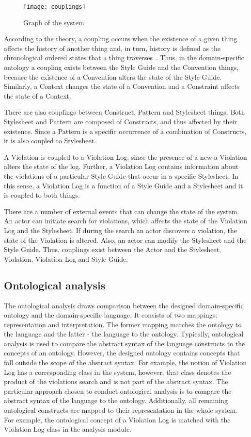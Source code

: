 \begin{figure}[h!]
  \centering
  \caption{Graph of the system}
  \label{fig:couplings}
  \texttt{[image: couplings]}
\end{figure}

According to the theory, a coupling occurs when the existence of a given thing affects the history
of another thing and, in turn, history is defined as the chronological ordered states that a thing
traverses~\cite{wand1990ontological}. Thus, in the domain-specific ontology a coupling exists
between the Style Guide and the Convention things, because the existence of a Convention alters the
state of the Style Guide. Similarly, a Context changes the state of a Convention and a Constraint
affects the state of a Context.

There are also couplings between Construct, Pattern and Stylesheet things. Both Stylesheet and
Pattern are composed of Constructs, and thus affected by their existence. Since a Pattern is a
specific occurrence of a combination of Constructs, it is also coupled to Stylesheet.

A Violation is coupled to a Violation Log, since the presence of a new a Violation alters the state
of the log. Further, a Violation Log contains information about the violations of a particular Style
Guide that occur in a specific Stylesheet. In this sense, a Violation Log is a function of a Style
Guide and a Stylesheet and it is coupled to both things.

There are a number of external events that can change the state of the system. An actor can initiate
search for violations, which affects the state of the Violation Log and the Stylesheet. If during
the search an actor discovers a violation, the state of the Violation is altered. Also, an actor can
modify the Stylesheet and the Style Guide. Thus, couplings exist between the Actor and the
Stylesheet, Violation, Violation Log and Style Guide.

\subsection{Ontological analysis}

The ontological analysis draws comparison between the designed domain-specific ontology and the
domain-specific language. It consists of two mappings: representation and interpretation. The former
mapping matches the ontology to the language and the latter - the language to the ontology.
Typically, ontological analysis is used to compare the abstract syntax of the language constructs to
the concepts of an ontology. However, the designed ontology contains concepts that fall outside the
scope of the abstract syntax. For example, the notion of Violation Log has a corresponding class in
the system, however, that class denotes the product of the violations search and is not part of the
abstract syntax. The particular approach chosen to conduct ontological analysis is to compare the
abstract syntax of the language to the ontology. Additionally, all remaining ontological constructs
are mapped to their representation in the whole system. For example, the ontological concept of a
Violation Log is matched with the Violation Log class in the analysis module.

